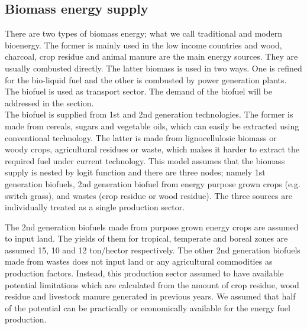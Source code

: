 \documentclass[10pt,a4paper,titlepage,dvipdfmx]{book}
\begin{document}
\subsection{\label{subsec:BioEneSup}Biomass energy supply}

There are two types of biomass energy; what we call traditional and modern bioenergy. The former is mainly used in the low income countries and wood, charcoal, crop residue and animal manure are the main energy sources. They are usually combusted directly. The latter biomass is used in two ways. One is refined for the bio-liquid fuel and the other is combusted by power generation plants. The biofuel is used as transport sector. The demand of the biofuel will be addressed in the section. \\

The biofuel is supplied from 1st and 2nd generation technologies. The former is made from cereals, sugars and vegetable oils, which can easily be extracted using conventional technology. The latter is made from lignocellulosic biomass or woody crops, agricultural residues or waste, which makes it harder to extract the required fuel under current technology. This model assumes that the biomass supply is nested by logit function and there are three nodes; namely 1st generation biofuels, 2nd generation biofuel from energy purpose grown crops (e.g. switch grass), and wastes (crop residue or wood residue). The three sources are individually treated as a single production sector.


The 2nd generation biofuels made from purpose grown energy crops are assumed to input land. The yields of them for tropical, temperate and boreal zones are assumed 15, 10 and 12 ton/hector respectively. The other 2nd generation biofuels made from wastes does not input land or any agricultural commodities as production factors. Instead, this production sector assumed to have available potential limitations which are calculated from the amount of crop residue, wood residue and livestock manure generated in previous years. We assumed that half of the potential can be practically or economically available for the energy fuel production.
\end{document}
